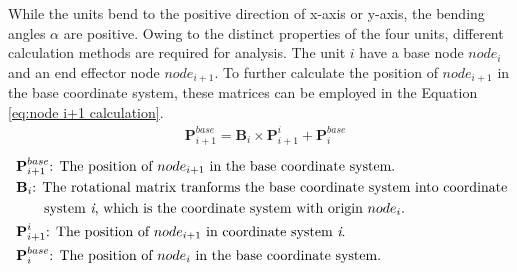 \noindent While the units bend to the positive direction of x-axis or y-axis, the bending angles $\alpha$ are positive. 
Owing to the distinct properties of the four units, different calculation methods are required for analysis. The unit $i$ 
have a base node $node_i$ and an end effector node $node_{i+1}$. To further calculate the position of $node_{i+1}$ in the 
base coordinate system, these matrices can be employed in the Equation \ref{eq:node i+1 calculation}.
\begin{align}
    &\textbf{P}_{i+1}^{base} = \textbf{B}_{i} \times \textbf{P}_{i+1}^{i} + \textbf{P}_{i}^{base}
    \label{eq:node i+1 calculation}
\end{align}
\begin{align*}
    &\ \textbf{P}_{i+1}^{base}\text{: The position of $node_{i+1}$ in the base coordinate system.}\\
    &\ \textbf{B}_{i}\text{: The rotational matrix tranforms the base coordinate system into coordinate}\\
    &\ \qquad\text{system \textit{i}, which is the coordinate system with origin $node_i$.}\\
    &\ \textbf{P}_{i+1}^{i}\text{: The position of $node_{i+1}$ in coordinate system \textit{i}.}\\
    &\ \textbf{P}_{i}^{base}\text{: The position of $node_{i}$ in the base coordinate system.}
\end{align*}

